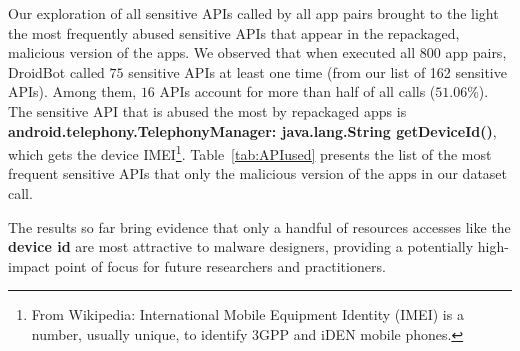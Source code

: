 

Our exploration of all sensitive APIs called by all app pairs brought to the light the most frequently abused sensitive APIs that
appear in the repackaged, malicious version of the apps. We observed that when executed all 800 app pairs, DroidBot called $75$ sensitive APIs at least one time (from our list of 162 sensitive APIs). Among them, $16$ APIs account for more than half of all calls ($51.06$\%).
The sensitive API that is abused the most by repackaged apps is \textbf{android.telephony.TelephonyManager: java.lang.String getDeviceId()}, which gets the device
IMEI\footnote{From Wikipedia: International Mobile Equipment Identity (IMEI) is a number, usually unique, to identify 3GPP and iDEN mobile phones.}.
Table~\ref{tab:APIused} presents the list of the most frequent sensitive APIs that only the malicious
version of the apps in our dataset call.

\begin{obs}{6}{}
  The results so far bring evidence that only a handful of resources accesses like the \textbf{device id} are most attractive to malware designers, providing a potentially high-impact point of focus for future researchers and practitioners.
\end{obs}

